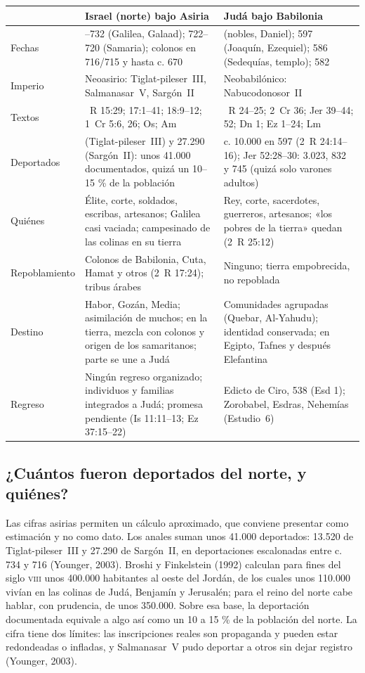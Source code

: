 \begin{table}[!htbp]\centering\footnotesize
\renewcommand{\arraystretch}{1.12}
\begin{tabular}{>{\RaggedRight\arraybackslash}p{2.3cm}>{\RaggedRight\arraybackslash}p{6.0cm}>{\RaggedRight\arraybackslash}p{6.0cm}}
\toprule
& \textbf{Israel (norte) bajo Asiria} & \textbf{Judá bajo Babilonia}\\
\midrule
Fechas & 733--732 (Galilea, Galaad); 722--720 (Samaria); colonos en 716/715 y hasta c. 670 & 605 (nobles, Daniel); 597 (Joaquín, Ezequiel); 586 (Sedequías, templo); 582\\
Imperio & Neoasirio: Tiglat-pileser~III, Salmanasar~V, Sargón~II & Neobabilónico: Nabucodonosor~II\\
Textos & 2~R 15:29; 17:1--41; 18:9--12; 1~Cr 5:6, 26; Os; Am & 2~R 24--25; 2~Cr 36; Jer 39--44; 52; Dn 1; Ez 1--24; Lm\\
Deportados & 13.520 (Tiglat-pileser~III) y 27.290 (Sargón~II): unos 41.000 documentados, quizá un 10--15 \% de la población & c. 10.000 en 597 (2~R 24:14--16); Jer 52:28--30: 3.023, 832 y 745 (quizá solo varones adultos)\\
Quiénes & Élite, corte, soldados, escribas, artesanos; Galilea casi vaciada; campesinado de las colinas en su tierra & Rey, corte, sacerdotes, guerreros, artesanos; «los pobres de la tierra» quedan (2~R 25:12)\\
Repoblamiento & Colonos de Babilonia, Cuta, Hamat y otros (2~R 17:24); tribus árabes & Ninguno; tierra empobrecida, no repoblada\\
Destino & Habor, Gozán, Media; asimilación de muchos; en la tierra, mezcla con colonos y origen de los samaritanos; parte se une a Judá & Comunidades agrupadas (Quebar, Al-Yahudu); identidad conservada; en Egipto, Tafnes y después Elefantina\\
Regreso & Ningún regreso organizado; individuos y familias integrados a Judá; promesa pendiente (Is 11:11--13; Ez 37:15--22) & Edicto de Ciro, 538 (Esd 1); Zorobabel, Esdras, Nehemías (Estudio~6)\\
\bottomrule
\end{tabular}\end{table}

\subsection{¿Cuántos fueron deportados del norte, y quiénes?}
Las cifras asirias permiten un cálculo aproximado, que conviene presentar como estimación y no como dato. Los anales suman unos 41.000 deportados: 13.520 de Tiglat-pileser~III y 27.290 de Sargón~II, en deportaciones escalonadas entre c. 734 y 716 (Younger, 2003). Broshi y Finkelstein (1992) calculan para fines del siglo \textsc{viii} unos 400.000 habitantes al oeste del Jordán, de los cuales unos 110.000 vivían en las colinas de Judá, Benjamín y Jerusalén; para el reino del norte cabe hablar, con prudencia, de unos 350.000. Sobre esa base, la deportación documentada equivale a algo así como un 10 a 15 \% de la población del norte. La cifra tiene dos límites: las inscripciones reales son propaganda y pueden estar redondeadas o infladas, y Salmanasar~V pudo deportar a otros sin dejar registro (Younger, 2003).

